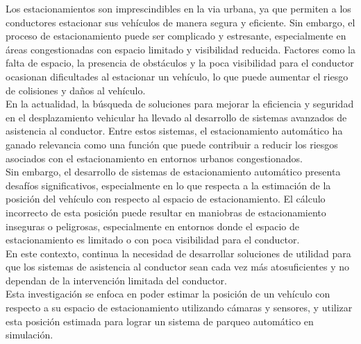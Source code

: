 \noindent
Los estacionamientos son imprescindibles en la via urbana, ya que permiten a los conductores estacionar sus vehículos
de manera segura y eficiente. Sin embargo, el proceso de estacionamiento puede ser complicado y estresante,
especialmente en áreas congestionadas con espacio limitado y visibilidad reducida.
Factores como la falta de espacio, la presencia de obstáculos y la poca visibilidad para el conductor ocasionan
dificultades al estacionar un vehículo, lo que puede aumentar el riesgo de colisiones y daños al vehículo.
\\
En la actualidad, la búsqueda de soluciones para mejorar la eficiencia y seguridad en el desplazamiento vehicular
ha llevado al desarrollo de sistemas avanzados de asistencia al conductor.
Entre estos sistemas, el estacionamiento automático ha ganado relevancia como una función que puede contribuir
a reducir los riesgos asociados con el estacionamiento en entornos urbanos congestionados.
\\
Sin embargo, el desarrollo de sistemas de estacionamiento automático presenta desafíos significativos,
especialmente en lo que respecta a la estimación de la posición del vehículo con respecto al espacio de estacionamiento.
El cálculo incorrecto de esta posición puede resultar en maniobras de estacionamiento inseguras o peligrosas,
especialmente en entornos donde el espacio de estacionamiento es limitado o con poca visibilidad para el conductor.
\\
En este contexto, continua la necesidad de desarrollar soluciones de utilidad para que los sistemas de asistencia al conductor
sean cada vez más atosuficientes y no dependan de la intervención limitada del conductor.
\\
Esta investigación se enfoca en poder estimar la posición de un vehículo con respecto a su espacio de estacionamiento
utilizando cámaras y sensores, y utilizar esta posición estimada para lograr un sistema de parqueo automático en simulación.